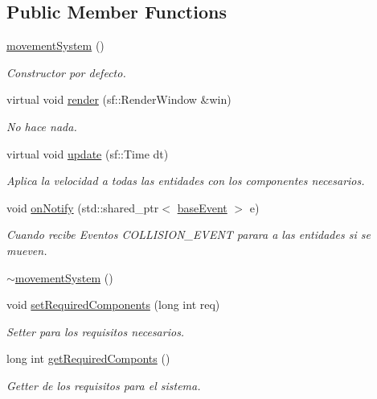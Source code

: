 \subsection*{Public Member Functions}
\begin{DoxyCompactItemize}
\item 
\hyperlink{classant_1_1movement_system_a39790555e3f9d2722f48e9e272dbe5ec}{movement\+System} ()
\begin{DoxyCompactList}\small\item\em Constructor por defecto. \end{DoxyCompactList}\item 
virtual void \hyperlink{classant_1_1movement_system_a23af25667217b499e894d87e1097a52b}{render} (sf\+::\+Render\+Window \&win)
\begin{DoxyCompactList}\small\item\em No hace nada. \end{DoxyCompactList}\item 
virtual void \hyperlink{classant_1_1movement_system_af7017a1d594b18a8a8d3bf925cd00881}{update} (sf\+::\+Time dt)
\begin{DoxyCompactList}\small\item\em Aplica la velocidad a todas las entidades con los componentes necesarios. \end{DoxyCompactList}\item 
void \hyperlink{classant_1_1movement_system_ab950deb32094a7c4e2ee2663c72b7ed7}{on\+Notify} (std\+::shared\+\_\+ptr$<$ \hyperlink{classant_1_1base_event}{base\+Event} $>$ e)
\begin{DoxyCompactList}\small\item\em Cuando recibe Eventos C\+O\+L\+L\+I\+S\+I\+O\+N\+\_\+\+E\+V\+E\+N\+T parara a las entidades si se mueven. \end{DoxyCompactList}\item 
\hyperlink{classant_1_1movement_system_a97b7c0733a6430c5bb26246803e02c8a}{$\sim$movement\+System} ()
\item 
void \hyperlink{classant_1_1_system_a35662ff3739ff4290df1106bfdccfaca}{set\+Required\+Components} (long int req)
\begin{DoxyCompactList}\small\item\em Setter para los requisitos necesarios. \end{DoxyCompactList}\item 
long int \hyperlink{classant_1_1_system_a2d94338969f43d4fd2fd972deb099258}{get\+Required\+Componts} ()
\begin{DoxyCompactList}\small\item\em Getter de los requisitos para el sistema. \end{DoxyCompactList}\item 

\end{DoxyCompactItemize}
